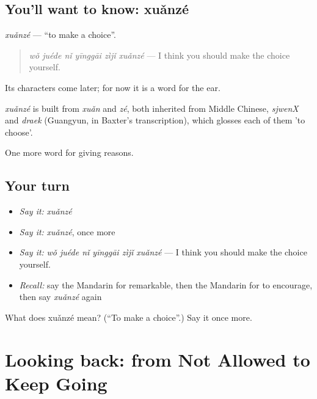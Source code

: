 \subsection*{You'll want to know: xuǎnzé}
\emph{xuǎnzé} — \textquotedblleft{}to make a choice\textquotedblright{}.

\begin{quote}
\emph{wǒ juéde nǐ yīnggāi zìjǐ xuǎnzé} — I think you should make the choice yourself.
\end{quote}

Its characters come later; for now it is a word for the ear.

\begin{cousinweb}
\emph{xuǎnzé} is built from \emph{xuǎn} and \emph{zé}, both inherited from Middle Chinese, \emph{sjwenX} and \emph{draek} (Guangyun, in Baxter's transcription), which glosses each of them 'to choose'.
\end{cousinweb}

\begin{grammarlens}[title={What you've built}]
One more word for giving reasons.
\end{grammarlens}

\subsection*{Your turn}
\begin{itemize}
\raggedright
  \item \emph{Say it:} \emph{xuǎnzé}
  \item \emph{Say it:} \emph{xuǎnzé}, once more
  \item \emph{Say it:} \emph{wǒ juéde nǐ yīnggāi zìjǐ xuǎnzé} — I think you should make the choice yourself.
  \item \emph{Recall:} say the Mandarin for remarkable, then the Mandarin for to encourage, then say \emph{xuǎnzé} again
\end{itemize}

\begin{tcolorbox}[breakable,colback=teal!4,colframe=teal!35!black,title={Before you move on}]
What does xuǎnzé mean? (\textquotedblleft{}To make a choice\textquotedblright{}.) Say it once more.
\end{tcolorbox}
\section[(dialogue)]{Looking back: from Not Allowed to Keep Going}

